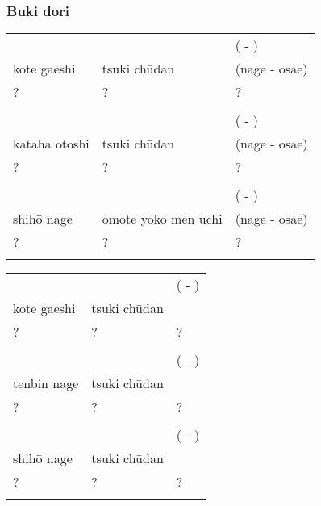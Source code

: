 \subsubsection{Buki dori}
\begin{table}[H]
\begin{center}
\begin{tabular}{lll}
\ruby{}{} & \ruby{}{} & (\ruby{}{} - \ruby{}{})\\
kote gaeshi & tsuki ch\={u}dan & (nage - osae)\\
? & ? & ?\\
\\
\ruby{}{} & \ruby{}{} & (\ruby{}{} - \ruby{}{})\\
kataha otoshi & tsuki ch\={u}dan & (nage - osae)\\
? & ? & ?\\
\\
\ruby{}{} & \ruby{}{} & (\ruby{}{} - \ruby{}{})\\
shih\={o} nage & omote yoko men uchi & (nage - osae)\\ 
? & ? & ?\\
\\
\end{tabular}
\end{center}
\label{dan_2_bukidori_tanto}
\end{table}

\begin{table}[H]
\begin{center}
\begin{tabular}{lll}
\ruby{}{} & \ruby{}{} & (\ruby{}{} - \ruby{}{})\\
kote gaeshi & tsuki ch\={u}dan & \\
? & ? & ?\\
\\
\ruby{}{} & \ruby{}{} & (\ruby{}{} - \ruby{}{})\\
tenbin nage & tsuki ch\={u}dan & \\
? & ? & ?\\
\\
\ruby{}{} & \ruby{}{} & (\ruby{}{} - \ruby{}{})\\
shih\={o} nage & tsuki ch\={u}dan & \\ 
? & ? & ?\\
\\
\end{tabular}
\end{center}
\label{dan_2_bukidori_hanbo}
\end{table}

